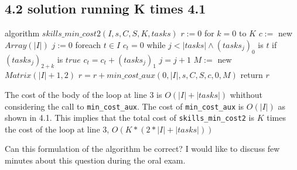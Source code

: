 \documentclass[paper=a4, fontsize=11pt]{scrartcl} %
\numberwithin{equation}{section} %
\numberwithin{figure}{section} %
\numberwithin{table}{section} %
\begin{document}
\newpage
\subsection*{4.2 solution running K times 4.1}

\begin{pseudo}
algorithm $skills\_min\_cost2(I, s, C, S, K, tasks)$
    $r := 0$
    for $k = 0$ to $K$
        $c :=$ new $Array(|I|)$
        $j := 0$
        foreach $t \in I$
            $c_t = 0$
            while $j < |tasks| \land (tasks_j)_0$ is $t$
                if $(tasks_j)_{2+k}$ is $true$
                    $c_t = c_t + (tasks_j)_1$
                $j = j +1$
        $M :=$ new $Matrix(|I|+1, 2)$
        $r = r + min\_cost\_aux(0, |I|, s, C, S, c, 0, M)$
    return $r$
\end{pseudo}

The cost of the body of the loop at line 3 is $O(|I|+|tasks|)$ whithout considering the call to \verb|min_cost_aux|.
The cost of \verb|min_cost_aux| is $O(|I|)$ as shown in 4.1.
This implies that the total cost of \verb|skills_min_cost2| is $K$ times the cost of the loop at line 3, $O(K*(2*|I|+|tasks|))$

Can this formulation of the algorithm be correct? I would like to discuss few minutes about this question during the oral exam.

\vfill
 

\end{document}
